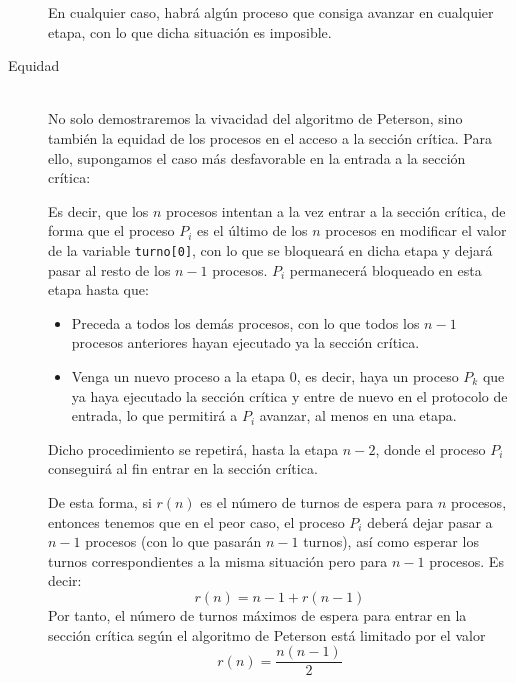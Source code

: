 \begin{description}
\begin{itemize}
\begin{itemize}
                \end{itemize}
        \end{itemize}
        En cualquier caso, habrá algún proceso que consiga avanzar en cualquier etapa, con lo que dicha situación es imposible.
    \item [Equidad]~\\
        No solo demostraremos la vivacidad del algoritmo de Peterson, sino también la equidad de los procesos en el acceso a la sección crítica. Para ello, supongamos el caso más desfavorable en la entrada a la sección crítica:

        Es decir, que los $n$ procesos intentan a la vez entrar a la sección crítica, de forma que el proceso $P_i$ es el último de los $n$ procesos en modificar el valor de la variable \verb|turno[0]|, con lo que se bloqueará en dicha etapa y dejará pasar al resto de los $n-1$ procesos. $P_i$ permanecerá bloqueado en esta etapa hasta que:
        \begin{itemize}
            \item Preceda a todos los demás procesos, con lo que todos los $n-1$ procesos anteriores hayan ejecutado ya la sección crítica.
            \item Venga un nuevo proceso a la etapa 0, es decir, haya un proceso $P_k$ que ya haya ejecutado la sección crítica y entre de nuevo en el protocolo de entrada, lo que permitirá a $P_i$ avanzar, al menos en una etapa.
        \end{itemize}
        Dicho procedimiento se repetirá, hasta la etapa $n-2$, donde el proceso $P_i$ conseguirá al fin entrar en la sección crítica.

        De esta forma, si $r(n)$ es el número de turnos de espera para $n$ procesos, entonces tenemos que en el peor caso, el proceso $P_i$ deberá dejar pasar a $n-1$ procesos (con lo que pasarán $n-1$ turnos), así como esperar los turnos correspondientes a la misma situación pero para $n-1$ procesos. Es decir:
        \begin{equation*}
            r(n) = n-1+r(n-1)
        \end{equation*}
        Por tanto, el número de turnos máximos de espera para entrar en la sección crítica según el algoritmo de Peterson está limitado por el valor
        \begin{equation*}
            r(n) = \dfrac{n(n-1)}{2}
        \end{equation*}
\end{description}

